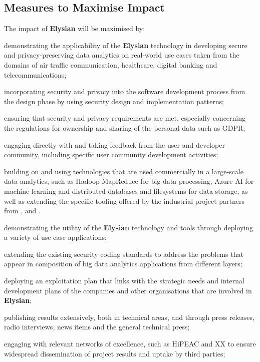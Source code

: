 \documentclass[a4paper,11pt]{article}
\newcommand{\project}[1]{\textbf{#1}\xspace}
\newcommand{\SECURITY}{\project{Elysian}}
\newcommand{\TheProject}{\SECURITY}
\begin{document}
\subsection{Measures to Maximise Impact}
The impact of \TheProject{} will be maximised by:
\begin{inparaenum}[i)]
\item
demonstrating the applicability of the \TheProject{} technology in developing secure and privacy-preserving data analytics on real-world use cases taken from the domains of air traffic communication, healthcare, digital banking and telecommunications;
\item
incorporating security and privacy into the software development process from the design phase by using security design and implementation patterns;
\item
ensuring that security and privacy requirements are met, especially concerning the regulations for ownership and sharing of the personal data such as GDPR;
\item
engaging directly with and taking feedback from the user and developer community, including specific user community development activities;
\item
building on and using technologies that are used commercially in a large-scale data analytics, such as Hadoop MapReduce for big data processing, Azure AI for machine learning and distributed databases and filesystems for data storage, as well as extending the specific tooling offered by the industrial project partners from \IBMshort{}, \YAGshort{} and \COGNIshort{}.
\item
demonstrating the utility of the \TheProject{} technology and tools through deploying a variety of use case applications;
\item
extending the existing security coding standards to address the problems that appear in composition of big data analytics applications from different layers;
\item
deploying an exploitation plan that links with the strategic needs and internal development plans of the companies and other organisations that are involved in \TheProject;
\item
publishing results extensively, both in technical areas, and through press releases, radio interviews, news items and the general technical press;
\item
engaging with relevant networks of excellence, such as HiPEAC and XX to ensure widespread dissemination of
project results and uptake by third parties;
\item

\end{inparaenum}
\end{document}
